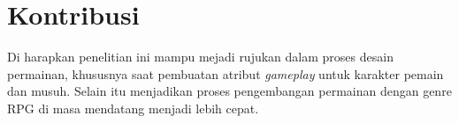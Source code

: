 \section{Kontribusi}
\vspace{1ex}

Di harapkan penelitian ini mampu mejadi rujukan dalam proses desain permainan, khususnya saat pembuatan atribut \textit{gameplay} untuk karakter pemain dan musuh. Selain itu menjadikan proses pengembangan permainan dengan genre RPG di masa mendatang menjadi lebih cepat.
